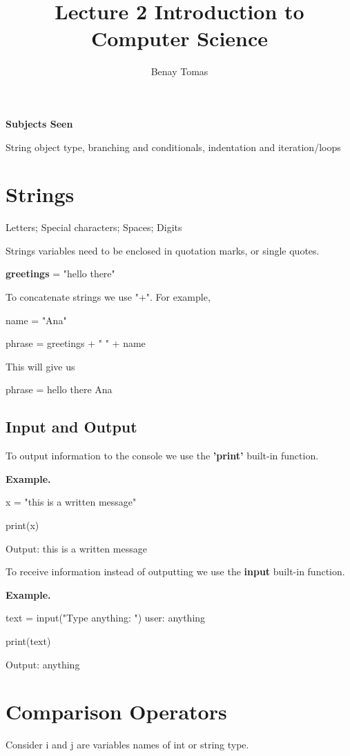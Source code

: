 \documentclass{article}
\title{Lecture 2 Introduction to Computer Science}
\author{Benay Tomas}
\begin{document}
\selectfont

\maketitle

\thispagestyle{empty}

\textbf{Subjects Seen}

String object type, branching and conditionals,
indentation and iteration/loops

\section{Strings}
Letters; Special characters; Spaces; Digits

Strings variables need to be enclosed in quotation marks, or single quotes.

\textbf{greetings} = "hello there"

\noindent
To concatenate strings we use "+".
For example,

name = "Ana"

phrase = greetings + " " + name

\noindent
This will give us

phrase = hello there Ana

\subsection{Input and Output}
To output information to the console
we use the \textbf{'print'} built-in function.

\textbf{Example.}

x = "this is a written message"

print(x)

Output: this is a written message

\noindent
To receive information instead of outputting
we use the \textbf{input} built-in function.

\textbf{Example.}

text = input("Type anything: ")
user: anything

print(text)

Output: anything

\section{Comparison Operators}
Consider i and j are variables names of int or string type.
\end{document}

